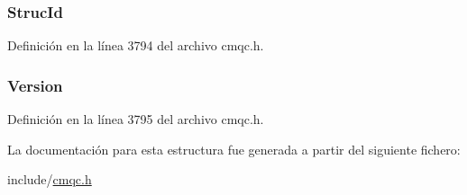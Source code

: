 \hypertarget{structtag_m_q_c_b_c_a0530922ca944569b52601d74941f96e4}{}
\subsubsection[{Struc\+Id}]{ Struc\+Id}\label{structtag_m_q_c_b_c_a0530922ca944569b52601d74941f96e4}


Definición en la línea 3794 del archivo cmqc.\+h.

\hypertarget{structtag_m_q_c_b_c_a0656ef8f766b3907d394d88a35d7b7e9}{}
\subsubsection[{Version}]{ Version}\label{structtag_m_q_c_b_c_a0656ef8f766b3907d394d88a35d7b7e9}


Definición en la línea 3795 del archivo cmqc.\+h.



La documentación para esta estructura fue generada a partir del siguiente fichero\+:\begin{DoxyCompactItemize}
\item 
include/\hyperlink{cmqc_8h}{cmqc.\+h}\end{DoxyCompactItemize}
